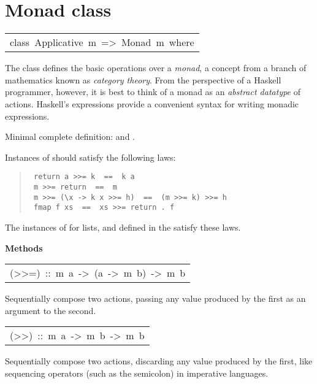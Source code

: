 \section{Monad class
}
\begin{haddockdesc}
\item[\begin{tabular}{@{}l}
class\ Applicative\ m\ =>\ Monad\ m\ where
\end{tabular}]\haddockbegindoc
The  class defines the basic operations over a \emph{monad},
a concept from a branch of mathematics known as \emph{category theory}.
From the perspective of a Haskell programmer, however, it is best to
think of a monad as an \emph{abstract datatype} of actions.
Haskell's  expressions provide a convenient syntax for writing
monadic expressions.
\par
Minimal complete definition: \haddockid{>>=} and .
\par
Instances of  should satisfy the following laws:
\par
\begin{quote}
{\haddockverb\begin{verbatim}
 return a >>= k  ==  k a
 m >>= return  ==  m
 m >>= (\x -> k x >>= h)  ==  (m >>= k) >>= h
 fmap f xs  ==  xs >>= return . f
\end{verbatim}}
\end{quote}
The instances of  for lists,  and 
defined in the  satisfy these laws.
\par

\haddockpremethods{}\textbf{Methods}
\begin{haddockdesc}
\item[\begin{tabular}{@{}l}
(>>=)\ ::\ m\ a\ ->\ (a\ ->\ m\ b)\ ->\ m\ b
\end{tabular}]\haddockbegindoc
Sequentially compose two actions, passing any value produced
 by the first as an argument to the second.
\par

\end{haddockdesc}
\begin{haddockdesc}
\item[\begin{tabular}{@{}l}
(>>)\ ::\ m\ a\ ->\ m\ b\ ->\ m\ b
\end{tabular}]\haddockbegindoc
Sequentially compose two actions, discarding any value produced
 by the first, like sequencing operators (such as the semicolon)
 in imperative languages.
\par


\end{haddockdesc}
\end{haddockdesc}

